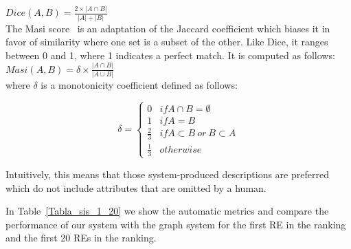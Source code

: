 $Dice(A,B) = \frac{2\times|A \cap B|}{|A|+|B|}$\\


The Masi score \cite{Passonneau06measuringagreement}~is an adaptation of the Jaccard coefficient
which biases it in favor of similarity where one set
is a subset of the other. Like Dice, it ranges between
0 and 1, where 1 indicates a perfect match. It is computed as follows:\\


$Masi(A,B) = \delta \times \frac{|A \cap B|}{|A \cup B|}$ \\


where $\delta$ is a monotonicity coefficient defined as follows:


 \begin{equation}
     \delta  = \left\{
	       \begin{array}{ll}
		 0      & if A \cap B = \emptyset \\
		 1 & if A = B  \\
		 \frac{2}{3}     & if A \subset B ~or~ B \subset A\\
		 \frac{1}{3}     & otherwise
	       \end{array}
	     \right.
 \end{equation}


Intuitively, this
means that those system-produced descriptions are
preferred which do not include attributes that are
omitted by a human.  

In Table~\ref{Tabla_sis_1_20} we show the automatic metrics and compare the performance of our system  with the graph system for the first RE in the ranking and the first 20 REs in the ranking. 


